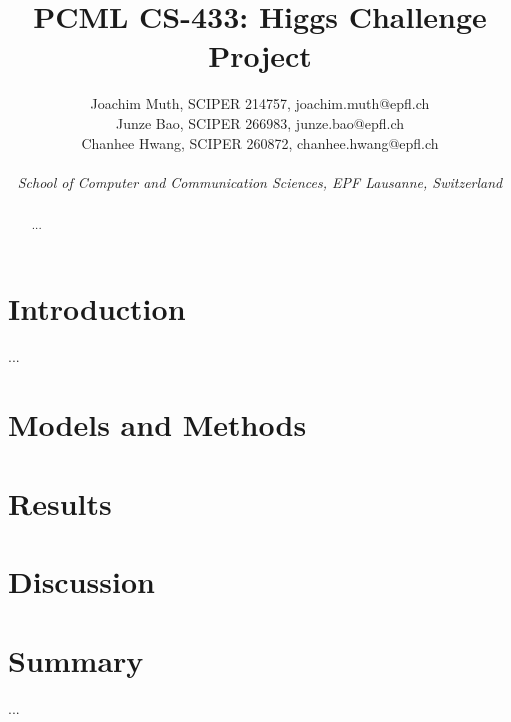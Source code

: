 \documentclass[10pt,conference,compsocconf]{IEEEtran}
\begin{document}
\title{PCML CS-433: Higgs Challenge Project}

\author{
  Joachim Muth, SCIPER 214757, joachim.muth@epfl.ch\\
  Junze Bao, SCIPER 266983, junze.bao@epfl.ch\\
  Chanhee Hwang, SCIPER 260872, chanhee.hwang@epfl.ch\\ \\
  \textit{School of Computer and Communication Sciences, EPF Lausanne, Switzerland}
}

\maketitle

\begin{abstract}
...
\end{abstract}

\section{Introduction}

...

\section{Models and Methods}


\section{Results}



\section{Discussion}


\section{Summary}

...




\end{document}
